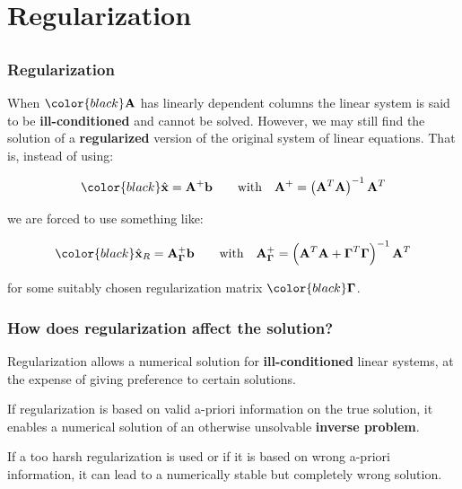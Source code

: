 \documentclass[compress]{beamer}
\newcommand{\black}[1]{{\color{black}#1}}
\renewcommand{\emph}[1]{\textbf{\black{#1}}}
\newcommand{\beq}[1]{\[\black{#1}\]}
\begin{document}

\section{Regularization}
\subsection*{}

\begin{frame}[fragile]
\frametitle{Regularization}

When $\black{\A}$ has linearly dependent columns the linear system is said to be \emph{ill-conditioned} and cannot be solved. However, we may still find the solution of a \emph{regularized} version of the original system of linear equations. That is, instead of using:


\beq{
\hat{\x} = \A^+\b		\qquad \textrm{with}\quad \A^+ = \left(\A^T\A\right)^{-1}\A^T
}

we are forced to use something like:

\beq{
\hat{\x}_R = \A^+_{\Gammam}\b		\qquad \textrm{with}\quad \A^+_{\Gammam}= \left(\A^T\A + \Gammam^T\Gammam\right)^{-1}\A^T
}

for some suitably chosen regularization matrix $\black{\Gammam}$.

\end{frame}


\begin{frame}[fragile]
\frametitle{How does regularization affect the solution?}

Regularization allows a numerical solution for \emph{ill-conditioned} linear systems, at the expense of giving preference to certain solutions.

\vspace{.5cm}
If regularization is based on valid a-priori information on the true solution, it enables a numerical solution of an otherwise unsolvable \emph{inverse problem}.

\vspace{.5cm}
If a too harsh regularization is used or if it is based on wrong a-priori information, it can lead to a numerically stable but completely wrong solution.


\end{frame}


\end{document}
